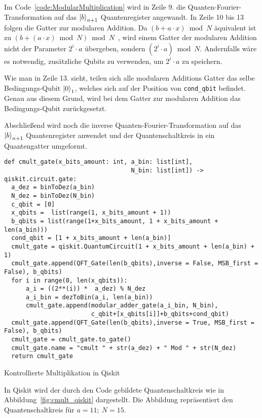 Im Code~\ref{code:ModularMultiplication} wird in Zeile 9. die Quanten-Fourier-Transformation auf 
das \(\ket{b}_{n+1}\) Quantenregister angewandt.
In Zeile 10 bis 13 folgen die Gatter zur modularen Addition.
Da \((b + a \cdot x) \bmod N\) äquivalent ist zu \((b + (a \cdot x)\bmod N) \bmod N\)~\cite{koepf_modular_2021}, 
wird einem Gatter der modularen Addition nicht der Parameter \(2^i\cdot a\) übergeben, 
sondern \({(2^i\cdot a)\bmod N}\).
Andernfalls wäre es notwendig, 
zusätzliche Qubits zu verwenden, um \(2^i\cdot a\) zu speichern.

Wie man in Zeile 13. sieht, teilen sich alle modularen Additions Gatter das selbe Bedingungs-Qubit \(\ket{0}_1\), 
welches sich auf der Position von \texttt{cond_qbit} befindet.
Genau aus diesem Grund, wird bei dem Gatter zur modularen Addition das Bedingungs-Qubit zurückgesetzt.

Abschließend wird noch die inverse Quanten-Fourier-Transformation auf das \(\ket{b}_{n+1}\) Quantenregister anwendet und 
der Quantenschaltkreis in ein Quantengatter umgeformt.

\begin{listing}[H]

\begin{verbatim}
def cmult_gate(x_bits_amount: int, a_bin: list[int],
                                   N_bin: list[int]) -> qiskit.circuit.gate:  
  a_dez = binToDez(a_bin)
  N_dez = binToDez(N_bin)
  c_qbit = [0]
  x_qbits =  list(range(1, x_bits_amount + 1))
  b_qbits = list(range(1+x_bits_amount, 1 + x_bits_amount + len(a_bin)))
  cond_qbit = [1 + x_bits_amount + len(a_bin)]
  cmult_gate = qiskit.QuantumCircuit(1 + x_bits_amount + len(a_bin) + 1)
  cmult_gate.append(QFT_Gate(len(b_qbits),inverse = False, MSB_first = False), b_qbits)
  for i in range(0, len(x_qbits)):
      a_i = ((2**(i)) *  a_dez) % N_dez
      a_i_bin = dezToBin(a_i, len(a_bin))
      cmult_gate.append(modular_adder_gate(a_i_bin, N_bin),
                        c_qbit+[x_qbits[i]]+b_qbits+cond_qbit)
  cmult_gate.append(QFT_Gate(len(b_qbits),inverse = True, MSB_first = False), b_qbits)
  cmult_gate = cmult_gate.to_gate()
  cmult_gate.name = "cmult " + str(a_dez) + " Mod " + str(N_dez)
  return cmult_gate
  \end{verbatim}
  \caption{Kontrollierte Multiplikation in Qiskit}
  \label{code:ModularMultiplication}
\end{listing}

In Qiskit wird der durch den Code gebildete Quantenschaltkreis wie in Abbildung~\ref{fig:cmult_qiskit} dargestellt.
Die Abbildung repräsentiert den Quantenschaltkreis für \(a = 11;~N = 15\).

